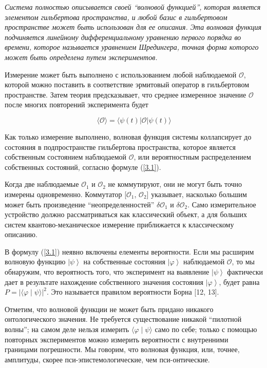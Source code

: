 \documentclass[main.tex]{subfiles}
\begin{document}
\textit{Система полностью описывается своей ``волновой функцией'', которая является элементом гильбертова пространства, и любой базис в гильбертовом пространстве может быть использован для ее описания. Эта волновая функция подчиняется линейному дифференциальному уравнению первого порядка во времени, которое называется уравнением Шредингера, точная форма которого может быть определена путем  экспериментов.}

Измерение может быть выполнено с использованием любой наблюдаемой $\mathcal{O}$, которой можно поставить в соответствие эрмитовый оператор в гильбертовом пространстве. Затем теория предсказывает, что среднее измеренное значение $\mathcal{O}$ после многих повторений эксперимента будет

\begin{equation}\label{3.1}
	\langle\mathcal{O}\rangle=\langle\psi(t)|\mathcal{O}| \psi(t)\rangle
\end{equation}

Как только измерение выполнено, волновая функция системы коллапсирует до состояния в подпространстве гильбертова пространства, которое является собственным состоянием наблюдаемой $\mathcal{O}$, или вероятностным распределением собственных состояний, согласно формуле (\ref{3.1}).

Когда две наблюдаемые $\mathcal{O}_1$ и $\mathcal{O}_2$ не коммутируют, они не могут быть точно измерены одновременно. Коммутатор [$\mathcal{O}_1$, $\mathcal{O}_2$] указывает, насколько большим может быть произведение ``неопределенностей'' $\delta\mathcal{O}_1$ и $\delta\mathcal{O}_2$. Само измерительное устройство должно рассматриваться как классический объект, а для больших систем квантово-механическое измерение приближается к классическому описанию.

В формулу (\ref{3.1}) неявно включены елементы вероятности. Если мы расширим волновую функцию $\left | \psi \right>$ на собственные состояния $\left | \varphi \right>$ наблюдаемой $\mathcal{O}$, то мы обнаружим, что вероятность того, что эксперимент на выявление $\left | \psi \right>$ фактически дает в результате нахождение собственного значения состояния $\left | \varphi \right>$, будет равна $P = \left| \langle\varphi\mid\psi\rangle \right|^2$. Это называется правилом вероятности Борна [12, 13].

Отметим, что волновой функции не может быть придано никакого онтологического значения. Не требуется существование никакой ``пилотной волны''; на самом деле нельзя измерить $\langle\varphi\mid\psi\rangle$ само по себе; только с помощью повторных экспериментов можно измерить вероятности с внутренними границами погрешности. Мы говорим, что волновая функция, или, точнее, амплитуды, скорее пси-эпистемологические, чем пси-онтические.
\end{document}
